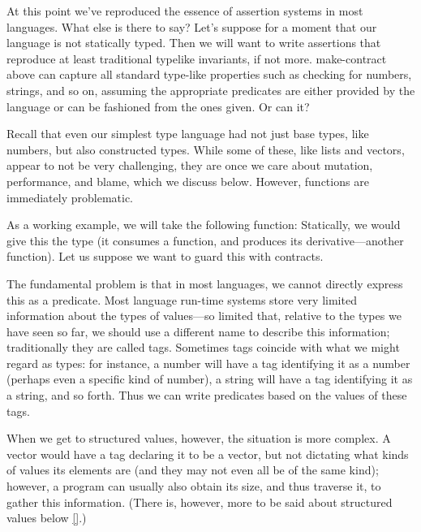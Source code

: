 
At this point we’ve reproduced the essence of assertion systems in most
languages. What else is there to say? Let’s suppose for a moment that our
language is not statically typed. Then we will want to write assertions that
reproduce at least traditional typelike invariants, if not more. make-contract
above can capture all standard type-like properties such as checking for
numbers, strings, and so on, assuming the appropriate predicates are either
provided by the language or can be fashioned from the ones given.
Or can it?

Recall that even our simplest type language had not just base types, like
numbers, but also constructed types. While some of these, like lists and
vectors, appear to not be very challenging, they are once we care about
mutation, performance, and blame, which we discuss below. However, functions are
immediately problematic.

As a working example, we will take the following function:
Statically, we would give this the type
(it consumes a function, and produces its derivative—another function). Let us
suppose we want to guard this with contracts.

The fundamental problem is that in most languages, we cannot directly express
this as a predicate. Most language run-time systems store very limited
information about the types of values—so limited that, relative to the types we
have seen so far, we should use a different name to describe this information;
traditionally they are called tags. Sometimes tags coincide with what we might
regard as types: for instance, a number will have a tag identifying it as a
number (perhaps even a specific kind of number), a string will have a tag
identifying it as a string, and so forth. Thus we can write predicates based on
the values of these tags.

When we get to structured values, however, the situation is more complex. A
vector would have a tag declaring it to be a vector, but not dictating what
kinds of values its elements are (and they may not even all be of the same
kind); however, a program can usually also obtain its size, and thus traverse
it, to gather this information. (There is, however, more to be said about
structured values below \ref{}.)

